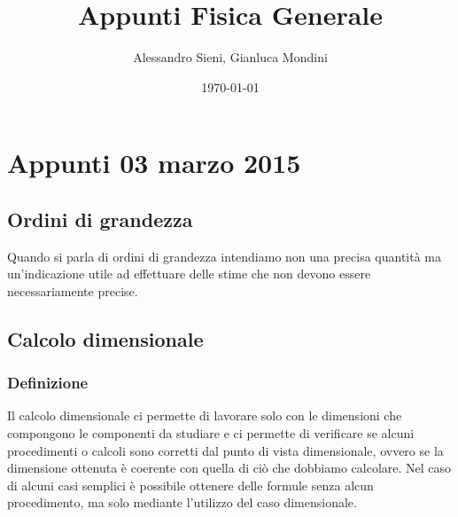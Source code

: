 \documentclass[paper = a4]{article}
\author{Alessandro Sieni, Gianluca Mondini}
\title{Appunti Fisica Generale}
\date{\today}
\begin{document}
\maketitle
\newpage
\tableofcontents
\newpage
\section{Appunti 03 marzo 2015}
\subsection{Ordini di grandezza}
Quando si parla di ordini di grandezza intendiamo non una precisa quantità ma un'indicazione utile ad effettuare delle stime che non devono essere necessariamente precise.
\subsection{Calcolo dimensionale}
\subsubsection{Definizione}
Il calcolo dimensionale ci permette di lavorare solo con le dimensioni che compongono le componenti da studiare e ci permette di verificare se alcuni procedimenti o calcoli sono corretti dal punto di vista dimensionale, ovvero se la dimensione ottenuta è coerente con quella di ciò che dobbiamo calcolare.
Nel caso di alcuni casi semplici è possibile ottenere delle formule senza alcun procedimento, ma solo mediante l'utilizzo del caso dimensionale.
\end{document}
